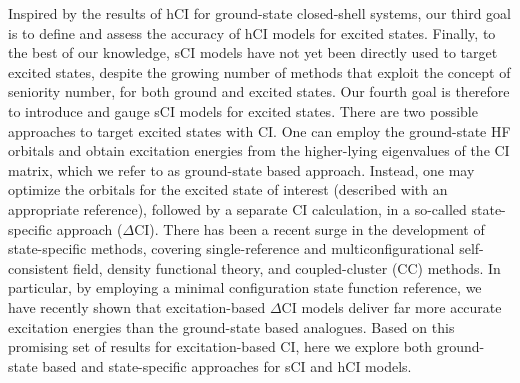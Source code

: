 \documentclass[aip,jcp,reprint,noshowkeys,superscriptaddress]{revtex4-1}
\begin{document}
Inspired by the results of hCI for ground-state closed-shell systems, \cite{Kossoski_2022} our third goal is to define and assess the accuracy of hCI models for excited states.
Finally, to the best of our knowledge, sCI models have not yet been directly used to target excited states,
despite the growing number of methods that exploit the concept of seniority number,
for both ground
\cite{Limacher_2013,Limacher_2014,Tecmer_2014,Boguslawski_2014a,Boguslawski_2015,Boguslawski_2014b,Boguslawski_2014c,Johnson_2020,Henderson_2014,Stein_2014,Henderson_2015,Chen_2015,Bytautas_2018,Marie_2021,Boguslawski_2021,Tecmer_2022,Mamache_2023} 
and excited states.
\cite{Boguslawski_2016b,Boguslawski_2016c,Boguslawski_2019,Nowak_2019,Kossoski_2021,Marie_2021,Tecmer_2022,Rishi_2023,Nowak_2023} 
Our fourth goal is therefore to introduce and gauge sCI models for excited states.
There are two possible approaches to target excited states with CI.
One can employ the ground-state HF orbitals and obtain excitation energies from the higher-lying eigenvalues of the CI matrix, which we refer to as ground-state based approach.
Instead, one may optimize the orbitals for the excited state of interest (described with an appropriate reference), followed by a separate CI calculation,
in a so-called state-specific approach ($\Delta$CI).
There has been a recent surge in the development of state-specific methods, covering 
single-reference and multiconfigurational self-consistent field,
\cite{Ziegler_1977,Burton_2021,Shea_2018,Tran_2019,Tran_2020,Hardikar_2020,Burton_2022,Hanscam_2022,Kossoski_2023,Marie_2023}
density functional theory, 
\cite{Filatov_1999,Kowalczyk_2011,Kowalczyk_2013,Gilbert_2008,Barca_2018,Hait_2020,Hait_2021,Hardikar_2020,Zhao_2020,Levi_2020,Carter-Fenk_2020,Toffoli_2022,Schmerwitz_2022}
and coupled-cluster (CC)
\cite{Piecuch_2000,Mayhall_2010,Lee_2019,Kossoski_2021,Marie_2021,Rishi_2023}
methods.
In particular, by employing a minimal configuration state function reference, 
we have recently shown that excitation-based $\Delta$CI models deliver far more accurate excitation energies than the ground-state based analogues. \cite{Kossoski_2023}
Based on this promising set of results for excitation-based CI, here we explore both ground-state based and state-specific approaches for sCI and hCI models.
\end{document}
